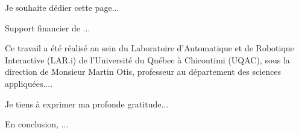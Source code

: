 \begin{ack}
Je souhaite dédier cette page...\par
Support financier de ... \par
Ce travail a été réalisé au sein du Laboratoire d'Automatique et de Robotique Interactive (LAR.i) de l’Université du Québec à Chicoutimi (UQAC), sous la direction de Monsieur Martin Otis, professeur au département des sciences appliquées....\par
Je tiens à exprimer ma profonde gratitude...\par
En conclusion, ...\par

\end{ack}
